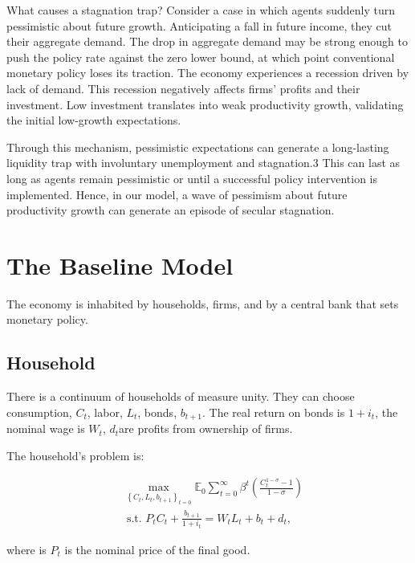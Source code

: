 \documentclass[cn,10pt,math=newtx,citestyle=gb7714-2015,bibstyle=gb7714-2015]{elegantbook}
\begin{document}
{{\begin{itemize}
		What causes a stagnation trap? Consider a case in which agents suddenly turn pessimistic about future growth. Anticipating a fall in future income, they cut their aggregate demand. The drop in aggregate demand may be strong enough to push the policy rate against the zero lower bound, at which point conventional monetary policy loses its traction. The economy experiences a recession driven by lack of demand. This recession negatively affects firms' profits and their investment. Low investment translates into weak productivity growth, validating the initial low-growth expectations.
		
		Through this mechanism, pessimistic expectations can generate a long-lasting liquidity trap with involuntary unemployment and stagnation.3 This can last as long as agents remain pessimistic or until a successful policy intervention is implemented. Hence, in our model, a wave of pessimism about future productivity growth can generate an episode of secular stagnation.
		
	\end{itemize}	

	
	
	
	\section{The Baseline Model}
	
	The economy is inhabited by households, firms, and by a central bank that sets monetary policy.

	\subsection{Household}
	
	There is a continuum of households of measure unity. They can choose consumption, $C_t$, labor, $L_t$, bonds, $b_{t+1}$. The real return on bonds is $1+i_t$, the nominal wage is $W_t$, $d_t$are profits from ownership of firms.
	
	The household's problem is:
	
	$$
	\begin{aligned}
		&\max _{\left\{C_{t}, L_{t}, b_{t+1}\right\}_{t=0}} \mathbb{E}_{0} \sum_{t=0}^{\infty} \beta^{t}\left(\frac{C_{t}^{1-\sigma}-1}{1-\sigma}\right) \\
		&\text { s.t. } P_tC_{t}+\frac{b_{t+1}}{1+i_t}=W_{t} L_{t}+b_t+d_{t},
	\end{aligned}
	$$
	
	where is $P_t$ is the nominal price of the final good.
	
}}
\end{document}

